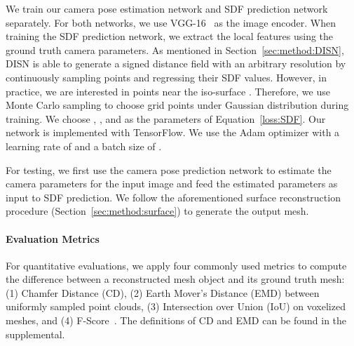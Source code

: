 We train our camera pose estimation network and SDF prediction network separately. For both networks, we use VGG-16~\cite{simonyan2014very} as the image encoder. When training the SDF prediction network, we extract the local features using the ground truth camera parameters. As mentioned in Section~\ref{sec:method:DISN}, DISN is able to generate a signed distance field with an arbitrary resolution by continuously sampling points and regressing their SDF values. However, in practice, we are interested in points near the iso-surface . Therefore, we use Monte Carlo sampling to choose  grid points under Gaussian distribution  during training. We choose , , and  as the parameters of Equation~\ref{loss:SDF}. Our network is implemented with TensorFlow. We use the Adam optimizer with a learning rate of  and a batch size of .  

For testing, we first use the camera pose prediction network to estimate the camera parameters for the input image and feed the estimated parameters as input to SDF prediction. We follow the aforementioned surface reconstruction procedure (Section~\ref{sec:method:surface}) to generate the output mesh. 

\paragraph{Evaluation Metrics}
For quantitative evaluations, we apply four commonly used metrics to compute the difference between a reconstructed mesh object and its ground truth mesh: (1) Chamfer Distance (CD), (2) Earth Mover’s Distance (EMD) between uniformly sampled point clouds, (3) Intersection over Union (IoU) on voxelized meshes, and (4) F-Score~\cite{tatarchenko2019single}. The definitions of CD and EMD can be found in the supplemental. 



